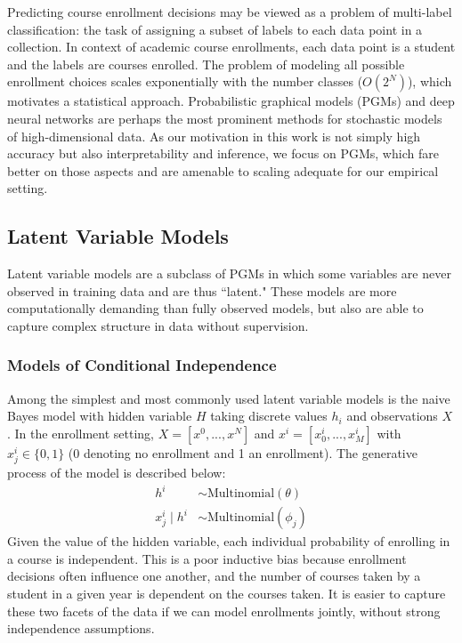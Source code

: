 \documentclass{edm_template}
\begin{document}
Predicting course enrollment decisions may be viewed as a problem of multi-label classification: the task of assigning a subset of labels to each data point in a collection. In context of academic course enrollments, each data point is a student and the labels are courses enrolled. The problem of modeling all possible enrollment choices scales exponentially with the number classes ($O(2^N)$), which motivates a statistical approach. Probabilistic graphical models (PGMs) and deep neural networks are perhaps the most prominent methods for stochastic models of high-dimensional data. As our motivation in this work is not simply high accuracy but also interpretability and inference, we focus on PGMs, which fare better on those aspects and are amenable to scaling adequate for our empirical setting.

\subsection{Latent Variable Models}
\label{section:latent-variable-models}

Latent variable models are a subclass of PGMs in which some variables are never observed in training data and are thus ``latent." These models are more computationally demanding than fully observed models, but also are able to capture complex structure in data without supervision.

\subsubsection{Models of Conditional Independence}
Among the simplest and most commonly used latent variable models is the naive Bayes model with hidden variable $H$ taking discrete values $h_i$ and observations $X$. In the enrollment setting, $X = [x^0, ..., x^N]$ and $x^i = [x^i_0, ..., x^i_M]$ with $x^i_j \in \{0,1\}$ (0 denoting no enrollment and 1 an enrollment). The generative process of the model is described below:
\begin{align*}
h^i &\sim \text{Multinomial}(\theta) \\
x^i_j \mid h^i &\sim \text{Multinomial}(\phi_{j}) 
\end{align*} 
Given the value of the hidden variable, each individual probability of enrolling in a course is independent. This is a poor inductive bias because enrollment decisions often influence one another, and the number of courses taken by a student in a given year is dependent on the courses taken. It is easier to capture these two facets of the data if we can model enrollments jointly, without strong independence assumptions.
\end{document}
